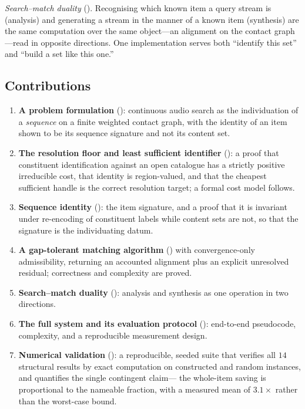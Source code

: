 \documentclass[11pt,twocolumn,a4paper]{article}
\theoremstyle{thmstyle}
\theoremstyle{definition}
\theoremstyle{remark}
\begin{document}
\emph{Search--match duality} (). Recognising which known item
a query stream is (analysis) and generating a stream in the manner of a known
item (synthesis) are the same computation over the same object---an alignment on
the contact graph---read in opposite directions. One implementation serves both
``identify this set'' and ``build a set like this one.''

\subsection{Contributions}

\begin{enumerate}[leftmargin=1.4em,itemsep=2pt]
\item \textbf{A problem formulation} (): continuous audio search
  as the individuation of a \emph{sequence} on a finite weighted contact graph,
  with the identity of an item shown to be its sequence signature and not its
  content set.
\item \textbf{The resolution floor and least sufficient identifier}
  (): a proof that constituent identification against an open
  catalogue has a strictly positive irreducible cost, that identity is
  region-valued, and that the cheapest sufficient handle is the correct
  resolution target; a formal cost model follows.
\item \textbf{Sequence identity} (): the item signature, and
  a proof that it is invariant under re-encoding of constituent labels while
  content sets are not, so that the signature is the individuating datum.
\item \textbf{A gap-tolerant matching algorithm} () with
  convergence-only admissibility, returning an accounted alignment plus an
  explicit unresolved residual; correctness and complexity are proved.
\item \textbf{Search--match duality} (): analysis and synthesis
  as one operation in two directions.
\item \textbf{The full system and its evaluation protocol}
  (): end-to-end pseudocode, complexity, and
  a reproducible measurement design.
\item \textbf{Numerical validation} (): a reproducible,
  seeded suite that verifies all $14$ structural results by exact computation on
  constructed and random instances, and quantifies the single contingent claim---%
  the whole-item saving is proportional to the nameable fraction, with a measured
  mean of $3.1\times$ rather than the worst-case bound.
\end{enumerate}
\end{document}
